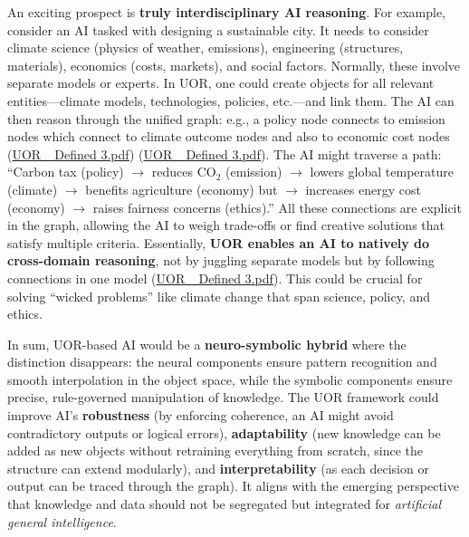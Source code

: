 \documentclass[12pt]{article}
\begin{document}
\medskip

An exciting prospect is \textbf{truly interdisciplinary AI reasoning}. For example, consider an AI tasked with designing a sustainable city. It needs to consider climate science (physics of weather, emissions), engineering (structures, materials), economics (costs, markets), and social factors. Normally, these involve separate models or experts. In UOR, one could create objects for all relevant entities---climate models, technologies, policies, etc.---and link them. The AI can then reason through the unified graph: e.g., a policy node connects to emission nodes which connect to climate outcome nodes and also to economic cost nodes (\href{file://file-3oEyMHjK5WgHWfYmLyzhts#:~:text=objects%29,could%20literally%20be%20%E2%80%9Con%20the}{UOR\_ Defined 3.pdf}) (\href{file://file-3oEyMHjK5WgHWfYmLyzhts#:~:text=,could%20literally%20be%20%E2%80%9Con%20the}{UOR\_ Defined 3.pdf}). The AI might traverse a path: ``Carbon tax (policy) $\rightarrow$ reduces CO$_2$ (emission) $\rightarrow$ lowers global temperature (climate) $\rightarrow$ benefits agriculture (economy) but $\rightarrow$ increases energy cost (economy) $\rightarrow$ raises fairness concerns (ethics).'' All these connections are explicit in the graph, allowing the AI to weigh trade-offs or find creative solutions that satisfy multiple criteria. Essentially, \textbf{UOR enables an AI to natively do cross-domain reasoning}, not by juggling separate models but by following connections in one model (\href{file://file-3oEyMHjK5WgHWfYmLyzhts#:~:text=Graph,to%20integrate%20diverse%20forms%20of}{UOR\_ Defined 3.pdf}). This could be crucial for solving ``wicked problems'' like climate change that span science, policy, and ethics.

\medskip

In sum, UOR-based AI would be a \textbf{neuro-symbolic hybrid} where the distinction disappears: the neural components ensure pattern recognition and smooth interpolation in the object space, while the symbolic components ensure precise, rule-governed manipulation of knowledge. The UOR framework could improve AI’s \textbf{robustness} (by enforcing coherence, an AI might avoid contradictory outputs or logical errors), \textbf{adaptability} (new knowledge can be added as new objects without retraining everything from scratch, since the structure can extend modularly), and \textbf{interpretability} (as each decision or output can be traced through the graph). It aligns with the emerging perspective that knowledge and data should not be segregated but integrated for \emph{artificial general intelligence}.
\end{document}
